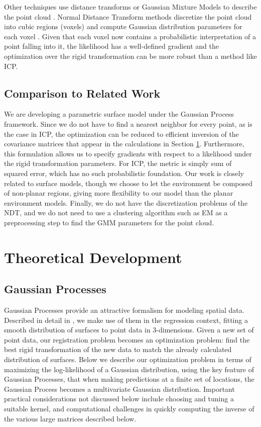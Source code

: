 \documentclass{article} %
\begin{document}
Other techniques use distance transforms or Gaussian Mixture Models to describe the point cloud\cite{tsin2004correlation} \cite{jian2005robust}. Normal Distance Transform methods discretize the point cloud into cubic regions (voxels) and compute Gaussian distribution parameters for each voxel \cite{biber2003normal}. Given that each voxel now contains a probabilistic interpretation of a point falling into it, the likelihood has a well-defined gradient and the optimization over the rigid transformation can be more robust than a method like ICP.

\subsection{Comparison to Related Work}

We are developing a parametric surface model under the Gaussian Process framework. Since we do not have to find a nearest neighbor for every point, as is the case in ICP, the optimization can be reduced to efficient inversion of the covariance matrices that appear in the calculations in Section \ref{sec:math}. Furthermore, this formulation allows us to specify gradients with respect to a likelihood under the rigid transformation parameters. For ICP, the metric is simply sum of squared error, which has no such probabilistic foundation. Our work is closely related to surface models, though we choose to let the environment be composed of non-planar regions, giving more flexibility to our model than the planar environment models. Finally, we do not have the discretization problems of the NDT, and we do not need to use a clustering algorithm such as EM as a preprocessing step to find the GMM parameters for the point cloud. 


\section{Theoretical Development}
\label{sec:math}

\subsection{Gaussian Processes}
Gaussian Processes provide an attractive formalism for modeling spatial data. Described in detail in \cite{rasmussen2006gaussian}, we make use of
them in the regression context, fitting a smooth distribution of surfaces to point data in 3-dimensions. Given a new set of point data, our registration problem becomes an optimization problem: find the best rigid transformation of the new data to match the already calculated distribution of surfaces. Below we describe our optimization problem in terms of
maximizing the log-likelihood of a Gaussian distribution, using the key feature of Gaussian Processes, that when making predictions at
a finite set of locations, the Gaussian Process becomes a multivariate Gaussian distribution. Important practical considerations not discussed below include choosing and tuning a suitable kernel, and computational challenges in quickly computing the inverse of the various large matrices described below.
\end{document}
